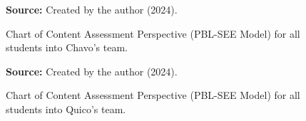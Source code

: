 \begin{figure}[ht!]
\centering

\caption{\textmd{Chart of Content Assessment Perspective (\acrshort{PBL-SEE} Model) for all students into Chavo's team.}}
\label{fig:pbl-see_content_in-chavos-team}

\par\medskip\ABNTEXfontereduzida\selectfont\textbf{Source:} Created by the author (2024).
\end{figure}

\begin{figure}[ht!]
\centering

\caption{\textmd{Chart of Content Assessment Perspective (\acrshort{PBL-SEE} Model) for all students into Quico's team.}}
\label{fig:pbl-see_content_in-quicos-team}

\par\medskip\ABNTEXfontereduzida\selectfont\textbf{Source:} Created by the author (2024).
\end{figure}

